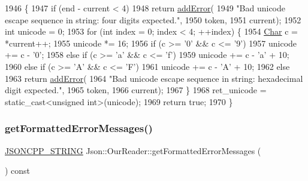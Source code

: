 \begin{DoxyCode}
1946                                                                     \{
1947   \textcolor{keywordflow}{if} (end - current < 4)
1948     \textcolor{keywordflow}{return} \hyperlink{class_json_1_1_our_reader_aa6a920311e6408ff3a45324d49da18a6}{addError}(
1949         \textcolor{stringliteral}{"Bad unicode escape sequence in string: four digits expected."},
1950         token,
1951         current);
1952   \textcolor{keywordtype}{int} unicode = 0;
1953   \textcolor{keywordflow}{for} (\textcolor{keywordtype}{int} index = 0; index < 4; ++index) \{
1954     \hyperlink{class_json_1_1_our_reader_a0cd0bab4caa66594ab843ccd5f9dc239}{Char} c = *current++;
1955     unicode *= 16;
1956     \textcolor{keywordflow}{if} (c >= \textcolor{charliteral}{'0'} && c <= \textcolor{charliteral}{'9'})
1957       unicode += c - \textcolor{charliteral}{'0'};
1958     \textcolor{keywordflow}{else} \textcolor{keywordflow}{if} (c >= \textcolor{charliteral}{'a'} && c <= \textcolor{charliteral}{'f'})
1959       unicode += c - \textcolor{charliteral}{'a'} + 10;
1960     \textcolor{keywordflow}{else} \textcolor{keywordflow}{if} (c >= \textcolor{charliteral}{'A'} && c <= \textcolor{charliteral}{'F'})
1961       unicode += c - \textcolor{charliteral}{'A'} + 10;
1962     \textcolor{keywordflow}{else}
1963       \textcolor{keywordflow}{return} \hyperlink{class_json_1_1_our_reader_aa6a920311e6408ff3a45324d49da18a6}{addError}(
1964           \textcolor{stringliteral}{"Bad unicode escape sequence in string: hexadecimal digit expected."},
1965           token,
1966           current);
1967   \}
1968   ret\_unicode = \textcolor{keyword}{static\_cast<}\textcolor{keywordtype}{unsigned} \textcolor{keywordtype}{int}\textcolor{keyword}{>}(unicode);
1969   \textcolor{keywordflow}{return} \textcolor{keyword}{true};
1970 \}
\end{DoxyCode}
\mbox{\label{class_json_1_1_our_reader_a7971de51d73bb4aee5b0c4742c4aaaac}} 
\subsubsection{\texorpdfstring{get\+Formatted\+Error\+Messages()}{getFormattedErrorMessages()}}
{\footnotesize\ttfamily \hyperlink{json_8h_a1e723f95759de062585bc4a8fd3fa4be}{J\+S\+O\+N\+C\+P\+P\+\_\+\+S\+T\+R\+I\+NG} Json\+::\+Our\+Reader\+::get\+Formatted\+Error\+Messages (\begin{DoxyParamCaption}{ }\end{DoxyParamCaption}) const}




